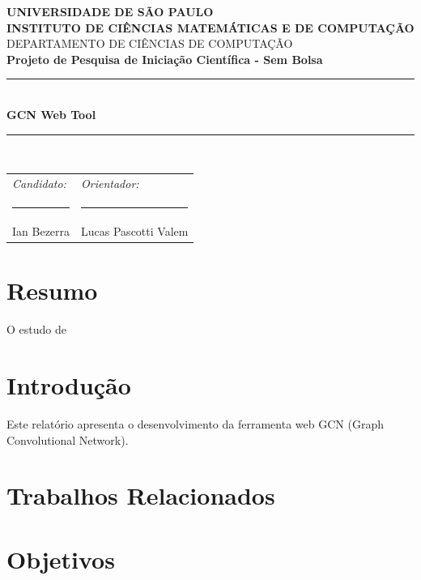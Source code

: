 \documentclass[12pt]{article}
\begin{document}
\begin{titlepage}
\begin{center}
\vspace*{1cm}
{\Large \textbf{UNIVERSIDADE DE SÃO PAULO}}\\[0.5cm]
{\Large \textbf{INSTITUTO DE CIÊNCIAS MATEMÁTICAS E DE COMPUTAÇÃO}}\\[0.5cm]
{\large DEPARTAMENTO DE CIÊNCIAS DE COMPUTAÇÃO}\\[4cm]

{\Large \textbf{Projeto de Pesquisa de Iniciação Científica - Sem Bolsa}}\\[0.5cm]
\rule{\linewidth}{0.5pt}\\[0.5cm]
{\LARGE \textbf{GCN Web Tool}}\\[0.5cm]
\rule{\linewidth}{0.5pt}\\[1.5cm]

\begin{tabular}{ll}
\textit{Candidato:} & \textit{Orientador:} \\[1cm]
\rule{6cm}{0.5pt} & \rule{6cm}{0.5pt} \\
Ian Bezerra & Lucas Pascotti Valem \\
\end{tabular}
\end{center}
\end{titlepage}

\section*{Resumo}

O estudo de 



\tableofcontents
\newpage

\section{Introdução}
Este relatório apresenta o desenvolvimento da ferramenta web GCN (Graph Convolutional Network).

\section{Trabalhos Relacionados}

\section{Objetivos}
\end{document}

